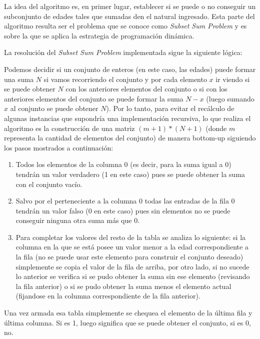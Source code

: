 \documentclass[11pt]{article}
\begin{document}
    La idea del algoritmo es, en primer lugar, establecer si se puede o no conseguir un subconjunto de edades tales que sumadas den el natural ingresado. Esta parte del algoritmo resulta ser el problema que se conoce como \emph{Subset Sum Problem} y es sobre la que se aplica la estrategia de programaci\'on din\'amica. 

    La resoluci\'on del \emph{Subset Sum Problem} implementada sigue la siguiente l\'ogica: 

    Podemos decidir si un conjunto de enteros (en este caso, las edades) puede formar una suma $N$ si vamos recorriendo el conjunto y por cada elemento $x$ ir viendo si se puede obtener $N$ con los anteriores elementos del conjunto o si con los anteriores elementos del conjunto se puede formar la suma $N-x$ (luego sumando $x$ al conjunto se puede obtener $N$). Por lo 
    tanto, para evitar el rec\'alculo de algunas instancias que supondr\'ia una implementaci\'on recursiva, lo que realiza el algoritmo es la construcci\'on de una matriz $(m+1)*(N+1)$ (donde $m$ representa la cantidad de elementos del conjunto) de manera bottom-up siguiendo los pasos mostrados a continuaci\'on: 

    \begin{enumerate}
      \item Todos los elementos de la columna 0 (es decir, para la suma igual a 0) tendr\'an un valor verdadero (1 en este caso) pues se puede obtener la suma con el conjunto vac\'io. 
      \item Salvo por el perteneciente a la columna 0 todas las entradas de la fila 0 tendr\'an un valor falso (0 en este caso) pues sin elementos no se puede conseguir ninguna otra suma m\'as que 0. 
      \item Para completar los valores del resto de la tabla se analiza lo siguiente: si la columna en la que se est\'a posee un valor menor a la edad correspondiente a la fila (no se puede usar este elemento para construir el conjunto deseado) simplemente se copia el valor de la fila de arriba, por otro lado, si no sucede lo anterior se verifica si se pudo obtener la suma sin ese elemento (revisando la fila anterior) o si se pudo obtener la suma menos el elemento actual (fijandose en la columna correspondiente de la fila anterior).
    \end{enumerate}

    Una vez armada esa tabla simplemente se chequea el elemento de la \'ultima fila y \'ultima columna. Si es 1, luego significa que se puede obtener el conjunto, si es 0, no.
\end{document}
